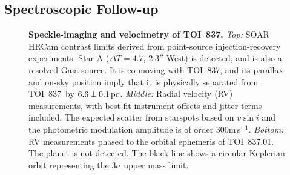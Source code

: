 \documentclass[12pt,twocolumn,tighten]{aastex63}
\newcommand{\tn}{TOI~837} %
\newcommand{\pn}{TOI~837.01} %
\begin{document}



\subsection{Spectroscopic Follow-up}
\label{subsec:spectra}

\begin{figure}[!t]
	\begin{center}
		\leavevmode
		
		\vspace{-0.3cm}
	\end{center}
	\vspace{-0.6cm}
	\caption{
    {\bf Speckle-imaging and velocimetry of \tn.} {\it Top:}
    SOAR HRCam contrast limits derived from point-source
    injection-recovery experiments. Star A ($\Delta T=4.7$, $2.3''$
    West) is detected, and is also a
    resolved Gaia source.  It is co-moving with \tn, and its parallax
    and on-sky position imply that it is physically separated from
    \tn\ by $6.6\pm 0.1\,{\rm pc}$.  {\it Middle:} Radial velocity
    (RV) measurements, with best-fit instrument offsets and jitter
    terms included.  The expected scatter from starspots based on
    $v\sin i$ and the photometric modulation amplitude is of order
    300m$\,$s$^{-1}$.  {\it Bottom:} RV measurements phased to the
    orbital ephemeris of \pn.  The planet is not detected.  The black
    line shows a circular Keplerian orbit representing the $3\sigma$
    upper mass limit.
		\label{fig:followup}
	}
\end{figure}
\end{document}
